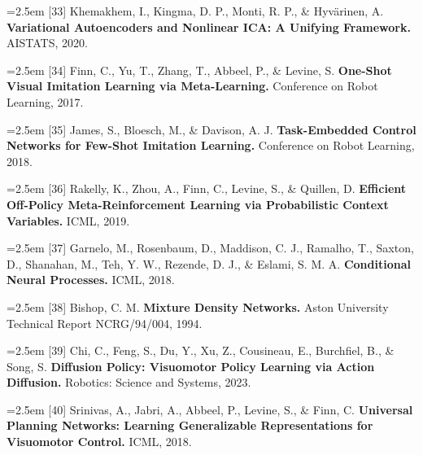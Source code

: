 \documentclass[11pt]{article}
\begin{document}
\noindent\hangindent=2.5em [33] Khemakhem, I., Kingma, D. P., Monti, R. P., \& Hyv\"arinen, A. \textbf{Variational Autoencoders and Nonlinear ICA: A Unifying Framework.} AISTATS, 2020.\par

\noindent\hangindent=2.5em [34] Finn, C., Yu, T., Zhang, T., Abbeel, P., \& Levine, S. \textbf{One-Shot Visual Imitation Learning via Meta-Learning.} Conference on Robot Learning, 2017.\par

\noindent\hangindent=2.5em [35] James, S., Bloesch, M., \& Davison, A. J. \textbf{Task-Embedded Control Networks for Few-Shot Imitation Learning.} Conference on Robot Learning, 2018.\par

\noindent\hangindent=2.5em [36] Rakelly, K., Zhou, A., Finn, C., Levine, S., \& Quillen, D. \textbf{Efficient Off-Policy Meta-Reinforcement Learning via Probabilistic Context Variables.} ICML, 2019.\par

\noindent\hangindent=2.5em [37] Garnelo, M., Rosenbaum, D., Maddison, C. J., Ramalho, T., Saxton, D., Shanahan, M., Teh, Y. W., Rezende, D. J., \& Eslami, S. M. A. \textbf{Conditional Neural Processes.} ICML, 2018.\par

\noindent\hangindent=2.5em [38] Bishop, C. M. \textbf{Mixture Density Networks.} Aston University Technical Report NCRG/94/004, 1994.\par

\noindent\hangindent=2.5em [39] Chi, C., Feng, S., Du, Y., Xu, Z., Cousineau, E., Burchfiel, B., \& Song, S. \textbf{Diffusion Policy: Visuomotor Policy Learning via Action Diffusion.} Robotics: Science and Systems, 2023.\par

\noindent\hangindent=2.5em [40] Srinivas, A., Jabri, A., Abbeel, P., Levine, S., \& Finn, C. \textbf{Universal Planning Networks: Learning Generalizable Representations for Visuomotor Control.} ICML, 2018.\par
\end{document}
